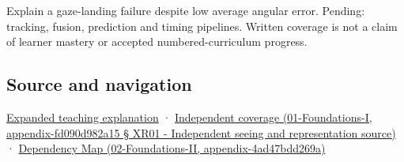 Explain a gaze-landing failure despite low average angular error. Pending: tracking, fusion, prediction and timing pipelines. Written coverage is not a claim of learner mastery or accepted numbered-curriculum progress.

\subsection{Source and navigation}\label{source-and-navigation}

\href{Continuous\%20Notes/University\%20-\%20Worlds,\%20Images\%20and\%20Inference\%20-\%20Graphics,\%20Vision\%20and\%20Photography\#A\%20gaze\%20sample\%20needs\%20a\%20time\%20as\%20well\%20as\%20a\%20direction}{Expanded teaching explanation} · \href{}{Independent coverage (01-Foundations-I, appendix-fd090d982a15 § XR01 - Independent seeing and representation source)} · \href{}{Dependency Map (02-Foundations-II, appendix-4ad47bdd269a)}
